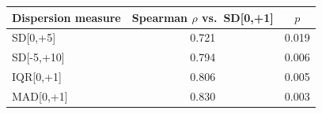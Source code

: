 \begin{tabular}{lcc}
\toprule
Dispersion measure & Spearman $\rho$ vs.\ SD[0,+1] & $p$ \\
\midrule
SD[0,+5] & 0.721 & 0.019 \\
SD[-5,+10] & 0.794 & 0.006 \\
IQR[0,+1] & 0.806 & 0.005 \\
MAD[0,+1] & 0.830 & 0.003 \\
\bottomrule
\end{tabular}